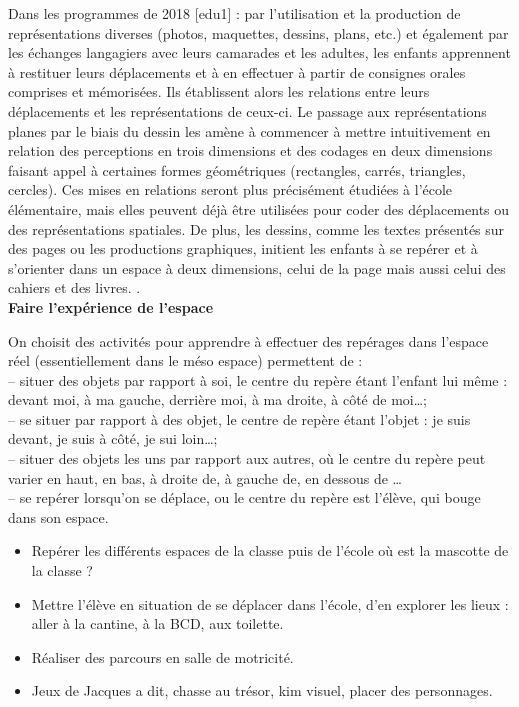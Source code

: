Dans les programmes de 2018 [edu1] : \og par l’utilisation et la production de représentations diverses (photos, maquettes, dessins, plans, etc.) et également par les échanges langagiers avec leurs camarades et les adultes, les enfants apprennent à restituer leurs déplacements et à en effectuer à partir de consignes orales comprises et mémorisées. Ils établissent alors les relations entre leurs déplacements et les représentations de ceux-ci. Le passage aux représentations planes par le biais du dessin les amène à commencer à mettre intuitivement en relation des perceptions en trois dimensions et des codages en deux dimensions faisant appel à certaines formes géométriques (rectangles, carrés, triangles, cercles). Ces mises en relations seront plus précisément étudiées à l’école élémentaire, mais elles peuvent déjà être utilisées pour coder des déplacements ou des représentations spatiales. De plus, les dessins, comme les textes présentés sur des pages ou les productions graphiques, initient les enfants à se repérer et à s’orienter dans un espace à deux dimensions, celui de la page mais aussi celui des cahiers et des livres. \fg. \\

{\bf\large Faire l'expérience de l'espace}

On choisit des activités pour apprendre à effectuer des repérages dans l'espace réel (essentiellement dans le méso espace) permettent de : \\
 -- situer des objets par rapport à soi, le centre du repère étant l'enfant lui même : \og devant moi, à ma gauche, derrière moi, à ma droite, à côté de moi\dots \fg ; \\
 -- se situer par rapport à des objet, le centre de repère étant l’objet : \og je suis devant, je suis à côté, je sui loin\dots \fg ; \\
 -- situer des objets les uns par rapport aux autres, où le centre du repère peut varier \og en haut, en bas, à droite de, à gauche de, en dessous de \dots \fg \\
 -- se repérer lorsqu'on se déplace, ou le centre du repère est l'élève, qui bouge dans son espace.

{\renewcommand{\StringDOCUMENTATION}{Exemples de situations}
\begin{documentation}
\begin{itemize}
   \item Repérer les différents espaces de la classe puis de l'école \og où est la mascotte de la classe ? \fg
   \item Mettre l'élève en situation de se déplacer dans l'école, d'en explorer les lieux : aller à la cantine, à la BCD, aux toilette.
   \item Réaliser des parcours en salle de motricité.
   \item Jeux de Jacques a dit, chasse au trésor, kim visuel, placer des personnages. \\ [-7mm]
   \end{itemize}
\end{documentation}}

